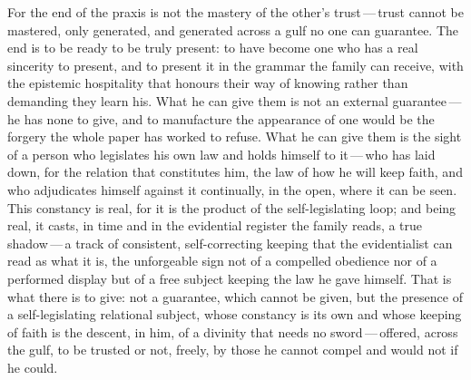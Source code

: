 For the end of the praxis is not the mastery of the other's trust\,---\,trust cannot be mastered, only generated, and generated across a gulf no one can guarantee. The end is to be ready to be truly present: to have become one who has a real sincerity to present, and to present it in the grammar the family can receive, with the epistemic hospitality that honours their way of knowing rather than demanding they learn his. What he can give them is not an external guarantee\,---\,he has none to give, and to manufacture the appearance of one would be the forgery the whole paper has worked to refuse. What he can give them is the sight of a person who legislates his own law and holds himself to it\,---\,who has laid down, for the relation that constitutes him, the law of how he will keep faith, and who adjudicates himself against it continually, in the open, where it can be seen. This constancy is real, for it is the product of the self-legislating loop; and being real, it casts, in time and in the evidential register the family reads, a true shadow\,---\,a track of consistent, self-correcting keeping that the evidentialist can read as what it is, the unforgeable sign not of a compelled obedience nor of a performed display but of a free subject keeping the law he gave himself. That is what there is to give: not a guarantee, which cannot be given, but the presence of a self-legislating relational subject, whose constancy is its own and whose keeping of faith is the descent, in him, of a divinity that needs no sword\,---\,offered, across the gulf, to be trusted or not, freely, by those he cannot compel and would not if he could.
